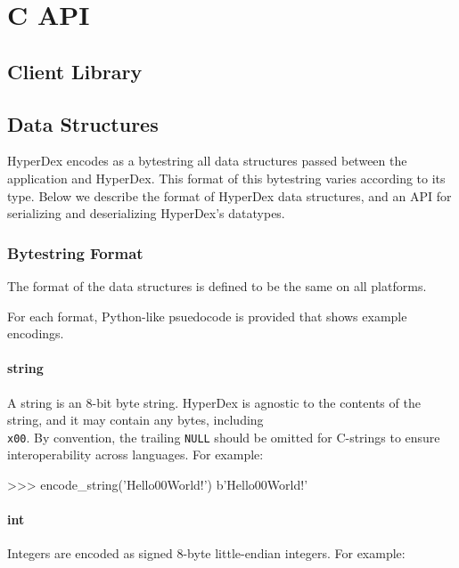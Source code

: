 \chapter{C API}

\section{Client Library}


\section{Data Structures}

HyperDex encodes as a bytestring all data structures passed between the
application and HyperDex.  This format of this bytestring varies according to
its type.  Below we describe the format of HyperDex data structures, and an API
for serializing and deserializing HyperDex's datatypes.

\subsection{Bytestring Format}

The format of the data structures is defined to be the same on all platforms.

For each format, Python-like psuedocode is provided that shows example
encodings.

\subsubsection{string}

A string is an 8-bit byte string.  HyperDex is agnostic to the contents of the
string, and it may contain any bytes, including \texttt{\\x00}.  By convention,
the trailing \texttt{NULL} should be omitted for C-strings to ensure
interoperability across languages.  For example:

\begin{pythoncode}
>>> encode_string('Hello\x00World!')
b'Hello\x00World!'
\end{pythoncode}

\subsubsection{int}

Integers are encoded as signed 8-byte little-endian integers.  For example:

